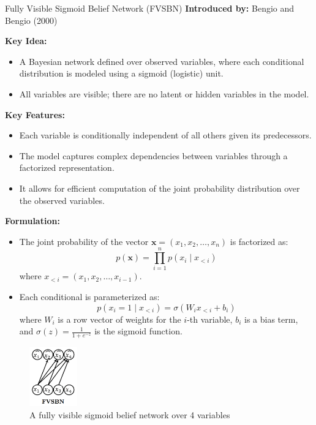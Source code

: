 \begin{frame}[allowframebreaks]{Fully Visible Sigmoid Belief Network (FVSBN)}
\textbf{Introduced by:} Bengio and Bengio (2000)

\textbf{Key Idea:}
\begin{itemize}
    \item A Bayesian network defined over observed variables, where each conditional distribution is modeled using a sigmoid (logistic) unit.
    \item All variables are visible; there are no latent or hidden variables in the model.
\end{itemize}

\textbf{Key Features:}
\begin{itemize}
    \item Each variable is conditionally independent of all others given its predecessors.
    \item The model captures complex dependencies between variables through a factorized representation.
    \item It allows for efficient computation of the joint probability distribution over the observed variables.
\end{itemize}

\framebreak

\textbf{Formulation:}
\begin{itemize}
    \item The joint probability of the vector $\mathbf{x} = (x_1, x_2, \ldots, x_n)$ is factorized as:
    \[
        p(\mathbf{x}) = \prod_{i=1}^n p(x_i \mid x_{<i})
    \]
    where $x_{<i} = (x_1, x_2, \ldots, x_{i-1})$.
    \item Each conditional is parameterized as:
    \[
        p(x_i = 1 \mid x_{<i}) = \sigma(W_i x_{<i} + b_i)
    \]
    where $W_i$ is a row vector of weights for the $i$-th variable, $b_i$ is a bias term, and $\sigma(z) = \frac{1}{1 + e^{-z}}$ is the sigmoid function.
\end{itemize}

\begin{figure}
    \centering
    \includegraphics[height=1.0in]{images/arm/fvsbn.png}
    \caption{A fully visible sigmoid belief network over 4 variables}
\end{figure}


\end{frame}
